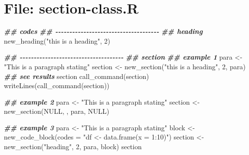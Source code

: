 \documentclass[
]{article}
\newenvironment{Shaded}{\begin{snugshade}}{\end{snugshade}}
\newcommand{\AttributeTok}[1]{\textcolor[rgb]{0.77,0.63,0.00}{#1}}
\newcommand{\ConstantTok}[1]{\textcolor[rgb]{0.00,0.00,0.00}{#1}}
\newcommand{\DecValTok}[1]{\textcolor[rgb]{0.00,0.00,0.81}{#1}}
\newcommand{\DocumentationTok}[1]{\textcolor[rgb]{0.56,0.35,0.01}{\textbf{\textit{#1}}}}
\newcommand{\FunctionTok}[1]{\textcolor[rgb]{0.00,0.00,0.00}{#1}}
\newcommand{\NormalTok}[1]{#1}
\newcommand{\OtherTok}[1]{\textcolor[rgb]{0.56,0.35,0.01}{#1}}
\newcommand{\StringTok}[1]{\textcolor[rgb]{0.31,0.60,0.02}{#1}}
\begin{document}
\hypertarget{file-section-class.r}{%
\section{File: section-class.R}\label{file-section-class.r}}

\begin{Shaded}
\begin{Highlighting}[]
\DocumentationTok{\#\# codes}
\DocumentationTok{\#\# {-}{-}{-}{-}{-}{-}{-}{-}{-}{-}{-}{-}{-}{-}{-}{-}{-}{-}{-}{-}{-}{-}{-}{-}{-}{-}{-}{-}{-}{-}{-}{-}{-}{-}{-}{-}{-} }
\DocumentationTok{\#\# heading}
\FunctionTok{new\_heading}\NormalTok{(}\StringTok{"this is a heading"}\NormalTok{, }\DecValTok{2}\NormalTok{)}

\DocumentationTok{\#\# {-}{-}{-}{-}{-}{-}{-}{-}{-}{-}{-}{-}{-}{-}{-}{-}{-}{-}{-}{-}{-}{-}{-}{-}{-}{-}{-}{-}{-}{-}{-}{-}{-}{-}{-}{-}{-} }
\DocumentationTok{\#\# section}
\DocumentationTok{\#\# example 1}
\NormalTok{para }\OtherTok{\textless{}{-}} \StringTok{"This is a paragraph stating"}
\NormalTok{section }\OtherTok{\textless{}{-}} \FunctionTok{new\_section}\NormalTok{(}\StringTok{"this is a heading"}\NormalTok{, }\DecValTok{2}\NormalTok{, para)}
\DocumentationTok{\#\# see results}
\NormalTok{section}
\FunctionTok{call\_command}\NormalTok{(section)}
\FunctionTok{writeLines}\NormalTok{(}\FunctionTok{call\_command}\NormalTok{(section))}

\DocumentationTok{\#\# example 2}
\NormalTok{para }\OtherTok{\textless{}{-}} \StringTok{"This is a paragraph stating"}
\NormalTok{section }\OtherTok{\textless{}{-}} \FunctionTok{new\_section}\NormalTok{(}\ConstantTok{NULL}\NormalTok{, , para, }\ConstantTok{NULL}\NormalTok{)}

\DocumentationTok{\#\# example 3}
\NormalTok{para }\OtherTok{\textless{}{-}} \StringTok{"This is a paragraph stating"}
\NormalTok{block }\OtherTok{\textless{}{-}} \FunctionTok{new\_code\_block}\NormalTok{(}\AttributeTok{codes =} \StringTok{"df \textless{}{-} data.frame(x = 1:10)"}\NormalTok{)}
\NormalTok{section }\OtherTok{\textless{}{-}} \FunctionTok{new\_section}\NormalTok{(}\StringTok{"heading"}\NormalTok{, }\DecValTok{2}\NormalTok{, para, block)}
\NormalTok{section}


\end{Highlighting}
\end{Shaded}
\end{document}
